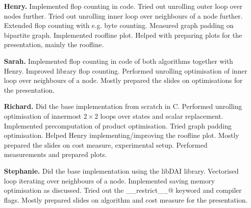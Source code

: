 \documentclass[final,letterpaper]{article}
\newcommand{\mypar}[1]{{\bf #1.}}
\begin{document}

\mypar{Henry} Implemented flop counting in code. Tried out unrolling outer loop over nodes further. Tried out unrolling inner loop over neighbours of a node further. Extended flop counting with e.g. byte counting. Measured graph padding on bipartite graph. Implemented roofline plot. Helped with preparing plots for the presentation, mainly the roofline.

\mypar{Sarah} Implemented flop counting in code of both algorithms together with Henry. Improved library flop counting. Performed unrolling optimisation of inner loop over neighbours of a node. Mostly prepared the slides on optimisations for the presentation.

\mypar{Richard} Did the base implementation from scratch in C.
Performed unrolling optimisation of innermost $2\times2$ loops over states and scalar replacement. Implemented precomputation of product optimisation. Tried graph padding optimisation. Helped Henry implementing/improving the roofline plot. Mostly prepared the slides on cost measure, experimental setup. Performed measurements and prepared plots.

\mypar{Stephanie} Did the base implementation using the libDAI library. Vectorised loop iterating over neighbours of a node. Implemented saving memory optimisation as discussed. Tried out the \verb@__restrict__@ keyword and compiler flags. Mostly prepared slides on algorithm and cost measure for the presentation.
\end{document}
